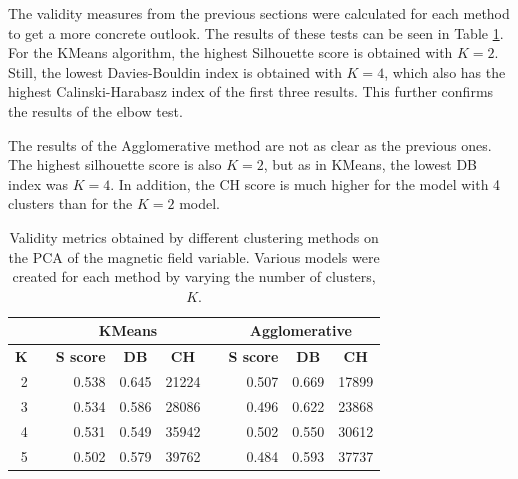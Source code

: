 The validity measures from the previous sections were calculated for each method to get a more concrete outlook. The results of these tests can be seen in Table \ref{tab:pca_b}. For the KMeans algorithm, the highest Silhouette score is obtained with $K=2$. Still, the lowest Davies-Bouldin index is obtained with $K=4$, which also has the highest Calinski-Harabasz index of the first three results. This further confirms the results of the elbow test. 

The results of the Agglomerative method are not as clear as the previous ones. The highest silhouette score is also $K=2$, but as in KMeans, the lowest DB index was $K=4$. In addition, the CH score is much higher for the model with 4 clusters than for the $K=2$ model.

\begin{table}[]
 \caption[Validity metrics for PCA of the Magnetic Field]{Validity metrics obtained by different clustering methods on the PCA of the magnetic field variable. Various models were created for each method by varying the number of clusters, $K$.}\label{tab:pca_b}
\begin{tabular}{@{}rlrrrlrcc@{}}
\toprule
\multicolumn{1}{c}{}           &  & \multicolumn{3}{c}{\textbf{KMeans}}                                                                      &  & \multicolumn{3}{c}{\textbf{Agglomerative}}   \\ \midrule
\multicolumn{1}{c}{\textbf{K}} &  & \multicolumn{1}{c}{\textbf{S score}} & \multicolumn{1}{c}{\textbf{DB}} & \multicolumn{1}{c}{\textbf{CH}} &  & \textbf{S score} & \textbf{DB} & \textbf{CH} \\ \midrule
2                              &  & 0.538                                & 0.645                           & 21224                           &  & 0.507            & 0.669       & 17899       \\
3                              &  & 0.534                                & 0.586                           & 28086                           &  & 0.496            & 0.622       & 23868       \\
4                              &  & 0.531                                & 0.549                           & 35942                           &  & 0.502            & 0.550       & 30612       \\
5                              &  & 0.502                                & 0.579                           & 39762                           &  & 0.484            & 0.593       & 37737       \\

\end{tabular}
\end{table}
